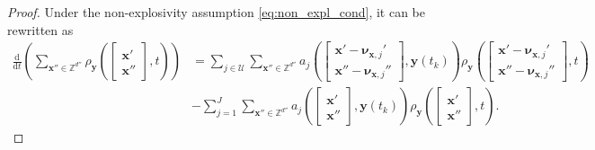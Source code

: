 \begin{proof}
    Under the non-explosivity assumption \eqref{eq:non_expl_cond}, it can be rewritten as
    \begin{equation}
    \label{eq:FMP_proof_1} 
    \begin{aligned}
        \frac{\mathrm{d}}{\mathrm{d} t} \left( \sum_{\boldsymbol{x}'' \in \mathbb{Z}^{d''}} \rho_{\boldsymbol{y}} \left( \begin{bmatrix} \boldsymbol{x}' \\ \boldsymbol{x}'' \end{bmatrix}, t \right) \right) 
        &= \sum_{j \in \mathcal{U}} \sum_{\boldsymbol{x}'' \in \mathbb{Z}^{d''}} a_j \left( \begin{bmatrix} \boldsymbol{x}' - \boldsymbol{\nu}_{\boldsymbol{x}, j}' \\ \boldsymbol{x}'' - \boldsymbol{\nu}_{\boldsymbol{x}, j}'' \end{bmatrix}, \boldsymbol{y}(t_k) \right) \rho_{\boldsymbol{y}} \left( \begin{bmatrix} \boldsymbol{x}' - \boldsymbol{\nu}_{\boldsymbol{x}, j}' \\ \boldsymbol{x}'' - \boldsymbol{\nu}_{\boldsymbol{x}, j}''\end{bmatrix}, t \right)  \\
        &- \sum_{j=1}^{J} \sum_{\boldsymbol{x}'' \in \mathbb{Z}^{d''}} a_j \left( \begin{bmatrix} \boldsymbol{x}' \\ \boldsymbol{x}'' \end{bmatrix}, \boldsymbol{y}(t_k) \right) \rho_{\boldsymbol{y}} \left( \begin{bmatrix} \boldsymbol{x}' \\ \boldsymbol{x}'' \end{bmatrix}, t \right) .
    \end{aligned}
    \end{equation}


\end{proof}
